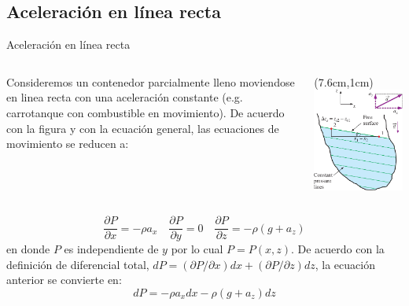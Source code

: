 \documentclass [xcolor=svgnames, t] {beamer}
\begin{document}
\subsection{Aceleraci\'on en l\'inea recta}
\begin{frame}{Aceleraci\'on en l\'inea recta}
\begin{columns}
Consideremos un contenedor parcialmente lleno moviendose en linea recta con una aceleraci\'on constante (e.g. carrotanque con combustible en movimiento). De acuerdo con la figura y con la ecuaci\'on general, las ecuaciones de  movimiento se reducen a:
\begin{textblock*}{4cm}(7.6cm,1cm) %
\includegraphics[width=\textwidth]{rigi}
\end{textblock*}
\end{columns}
\vspace{0.5cm}
$$
\frac{\partial P}{\partial x}=-\rho a_x \quad \frac{\partial P}{\partial y} = 0 \quad \frac{\partial P}{\partial z}=-\rho(g+ a_z)
$$
en donde $P$ es independiente de $y$ por lo cual $P=P(x,z)$. De acuerdo con la definici\'on de diferencial total, $dP = (\partial P / \partial x)dx + (\partial P / \partial z)dz$, la ecuaci\'on anterior se convierte en:
$$
dP = -\rho a_x dx - \rho(g + a_z)dz
$$
\end{frame}
\end{document}
